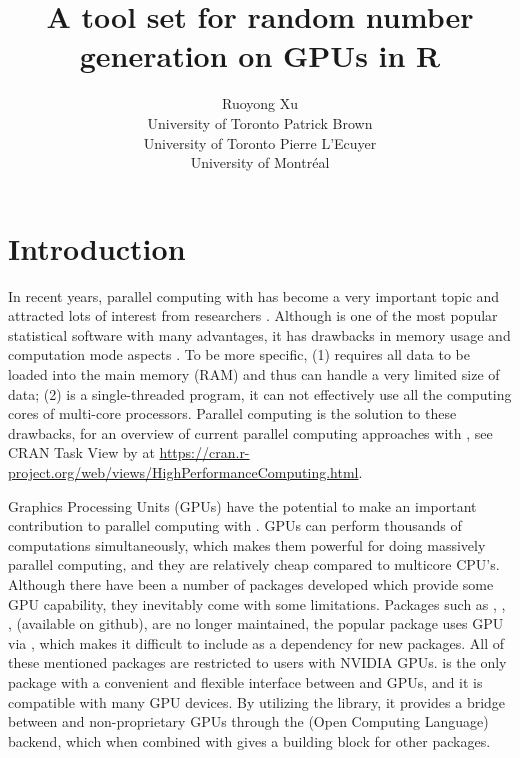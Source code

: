 \documentclass[article,nojss]{jss}\usepackage[]{graphicx}\usepackage[]{color}
\author{Ruoyong Xu\\University of Toronto
   \And Patrick Brown\\University of Toronto
   \And Pierre L’Ecuyer\\University of Montr\'eal}
\title{A tool set for random number generation on GPUs in R}
\begin{document}



\section[Introduction]{Introduction}

% 

In recent years, parallel computing with  \citep{r2021} has become a very important topic and attracted lots of interest from researchers \citep[see][for a review]{eddelbuettel2021parallel}. Although  is one of the most popular statistical software with many advantages, it has drawbacks in memory usage and computation mode aspects \citep{zhao_2016}. To be more specific, (1)  requires all data to be loaded into the main memory (RAM) and thus can handle a very limited size of data; (2)  is a single-threaded program, it can not effectively use all the computing cores of multi-core processors. Parallel computing is the solution to these drawbacks, for an overview of current parallel computing approaches with , see CRAN Task View by \citet{cran2021} at \url{https://cran.r-project.org/web/views/HighPerformanceComputing.html}. 

Graphics Processing Units (GPUs) have the potential to make an important contribution to parallel computing with . GPUs can perform thousands of computations simultaneously, which makes them powerful for doing massively parallel computing, and they are relatively cheap compared to multicore CPU's. Although there have been a number of  packages developed which provide some GPU capability, they inevitably come with some limitations. Packages such as , , ,  (available on github), are no longer maintained, the popular  \citep{tensorflow1} package uses GPU via , which makes it difficult to include as a dependency for new  packages. All of these mentioned packages are restricted to  users with NVIDIA GPUs.  \citep{gpur1} is the only  package with a convenient and flexible interface between  and GPUs, and it is compatible with many GPU devices. By utilizing the  \citep*{rupp2016viennacl} library, it provides a bridge between  and non-proprietary GPUs through the  (Open Computing Language) backend, which when combined with  \citep{rcpp1} gives a building block for other  packages. 
\end{document}
